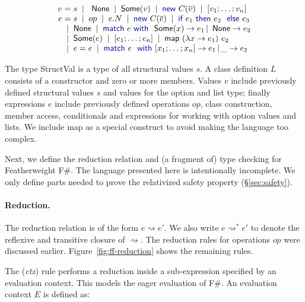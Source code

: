 \documentclass[10pt,preprint,blind,clearpagebib]{sigplanconf}
\newcommand{\kvd}[1]{\textnormal{\textcolor{kvdclr}{\sffamily #1}}}
\newcommand{\ident}[1]{\textnormal{\sffamily #1}}
\newcommand{\lsep}[0]{\;\; | \;\;}
\newcommand{\narrow}[1]{\hspace{-0.7em} #1 \hspace{-0.7em}}
\newcommand{\reduce}{\rightsquigarrow}
\begin{document}
\noindent
\begin{equation*}
\begin{array}{rcl}
 v &\narrow{=}& s \lsep \ident{None} \lsep \ident{Some}(v) \lsep \kvd{new}~C(\overline{v}) \lsep [v_1; \ldots; v_n] \\[0.0em]
 e &\narrow{=}& s \lsep op \lsep e.N \lsep \kvd{new}~C(\overline{e}) \lsep {\kvd{if}~e_1~\kvd{then}~e_2~\kvd{else}~e_3}\\
   &\narrow{|}& \ident{None} \lsep\kvd{match}~e~\kvd{with}~\ident{Some}(x) \rightarrow e_1 \,|\, \ident{None} \rightarrow e_2 \\
   &\narrow{|}& \ident{Some}(e) \lsep [e_1;\ldots;e_n]\lsep \ident{map}~(\lambda x\rightarrow e_1)~e_2\\
   &\narrow{|}& e = e \lsep \kvd{match}~e~\kvd{with}~[x_1; \ldots; x_n] \rightarrow e_1 \,|\, \_ \rightarrow e_2
\end{array}
\end{equation*}

\noindent
The type \ident{StructVal} is a type of all structural values $s$. A class
definition $L$ consists of a constructor and zero or more members. Values $v$ include 
previously defined structural values $s$ and values for the option and list type; finally 
expressions $e$ include previously defined operations $op$, class construction, member access, 
conditionals and expressions for working with option values and lists. We include 
\ident{map} as a special construct to avoid making the language too complex.

Next, we define the reduction relation and (a fragment of) type checking for Featherweight F\#.
The language presented here is intentionally incomplete. We only define parts needed to prove
the relativized safety property (\S\ref{sec:safety}).

\paragraph{Reduction.}
The reduction relation is of the form $e \reduce e'$. We also write 
$e \reduce^{*} e'$ to denote the reflexive and transitive closure of $\reduce$. The reduction rules
for operations $op$ were discussed earlier. Figure~\ref{fig:ff-reduction} shows the remaining
rules.

The (\emph{ctx}) rule performs a reduction inside a sub-expression specified by an evaluation context.
This models the eager evaluation of F\#. An evaluation context $E$ is defined as:
\end{document}
